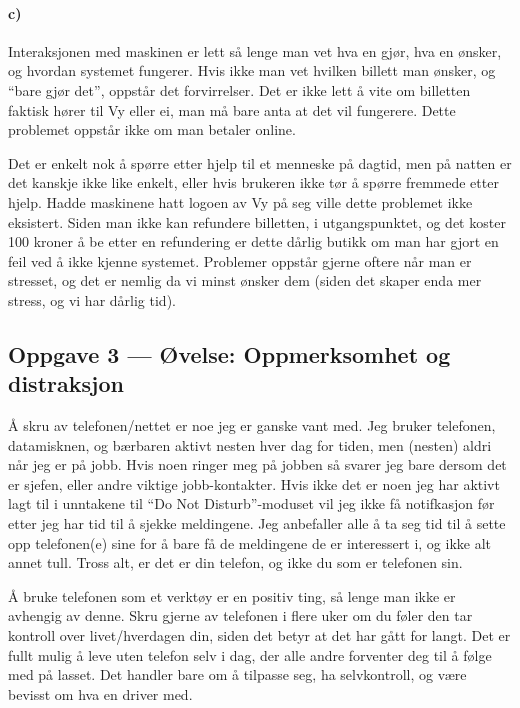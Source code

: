 \documentclass{../../myassignment}
\begin{document}
	\paragraph*{c)}  %

	Interaksjonen med maskinen er lett s{\aa} lenge man vet hva en gj{\o}r, hva en {\o}nsker, og hvordan systemet fungerer. Hvis ikke man vet hvilken billett man {\o}nsker, og ``bare gj{\o}r det'', oppst{\aa}r det forvirrelser. Det er ikke lett å vite om billetten faktisk hører til Vy eller ei, man må bare anta at det vil fungerere. Dette problemet oppstår ikke om man betaler online.

	Det er enkelt nok å spørre etter hjelp til et menneske på dagtid, men på natten er det kanskje ikke like enkelt, eller hvis brukeren ikke tør å spørre fremmede etter hjelp. Hadde maskinene hatt logoen av Vy på seg ville dette problemet ikke eksistert. Siden man ikke kan refundere billetten, i utgangspunktet, og det koster 100 kroner å be etter en refundering er dette dårlig butikk om man har gjort en feil ved å ikke kjenne systemet. Problemer oppstår gjerne oftere når man er stresset, og det er nemlig da vi minst ønsker dem (siden det skaper enda mer stress, og vi har dårlig tid).

	\subsection*{Oppgave 3 --- Øvelse: Oppmerksomhet og distraksjon}

	{\AA} skru av telefonen/nettet er noe jeg er ganske vant med. Jeg bruker telefonen, datamisknen, og b{\ae}rbaren aktivt nesten hver dag for tiden, men (nesten) aldri n{\aa}r jeg er p{\aa} jobb. Hvis noen ringer meg p{\aa} jobben s{\aa} svarer jeg bare dersom det er sjefen, eller andre viktige jobb-kontakter. Hvis ikke det er noen jeg har aktivt lagt til i unntakene til ``Do Not Disturb''-moduset vil jeg ikke f{\aa} notifkasjon f{\o}r etter jeg har tid til {\aa} sjekke meldingene. Jeg anbefaller alle {\aa} ta seg tid til {\aa} sette opp telefonen(e) sine for {\aa} bare f{\aa} de meldingene de er interessert i, og ikke alt annet tull. Tross alt, er det er din telefon, og ikke du som er telefonen sin. 

	{\AA} bruke telefonen som et verkt{\o}y er en positiv ting, s{\aa} lenge man ikke er avhengig av denne. Skru gjerne av telefonen i flere uker om du f{\o}ler den tar kontroll over livet/hverdagen din, siden det betyr at det har g{\aa}tt for langt. Det er fullt mulig {\aa} leve uten telefon selv i dag, der alle andre forventer deg til {\aa} f{\o}lge med p{\aa} lasset. Det handler bare om {\aa} tilpasse seg, ha selvkontroll, og v{\ae}re bevisst om hva en driver med. 
\end{document}
